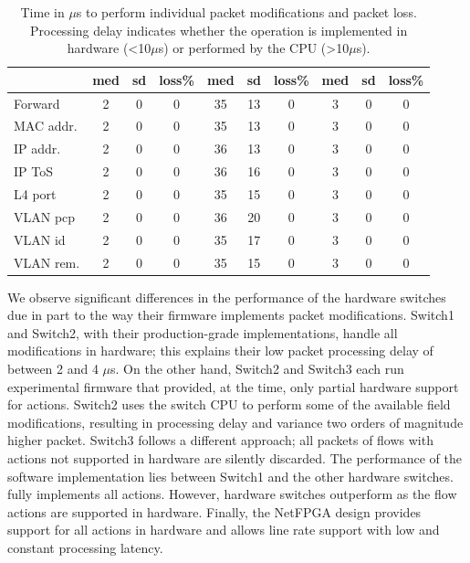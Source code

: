 \begin{table}[tb]
\begin{tabular}[t]{|l | c | c | c || c | c | c || c | c | c |}
              & med & sd & loss\% & med & sd & loss\% & med & sd & loss\% \\ \hline  
    Forward   & 2   & 0  & 0      & 35  & 13 & 0      & 3   & 0  & 0      \\\hline  
    MAC addr. & 2   & 0  & 0      & 35  & 13 & 0      & 3   & 0  & 0      \\ \hline  
    IP addr.  & 2   & 0  & 0      & 36  & 13 & 0      & 3   & 0  & 0      \\ \hline  
    IP ToS    & 2   & 0  & 0      & 36  & 16 & 0      & 3   & 0  & 0      \\ \hline  
    L4 port   & 2   & 0  & 0      & 35  & 15 & 0      & 3   & 0  & 0      \\ \hline  
    VLAN pcp  & 2   & 0  & 0      & 36  & 20 & 0      & 3   & 0  & 0      \\ \hline  
    VLAN id   & 2   & 0  & 0      & 35  & 17 & 0      & 3   & 0  & 0      \\ \hline  
    VLAN rem. & 2   & 0  & 0      & 35  & 15 & 0      & 3   & 0  & 0      \\ \hline
  \end{tabular}
 
  \caption[Switch action latency.]{Time in $\mu$s to perform individual packet
    modifications and packet loss. Processing delay indicates whether the
    operation is implemented in hardware (\textless10$\mu$s) or performed by
    the CPU (\textgreater10$\mu$s).}
  \label{tbl:feature_delay}
\end{table}

We observe significant differences in the performance of the hardware switches
due in part to the way their firmware implements packet modifications. Switch1
and Switch2, with their production-grade implementations, handle all
modifications in hardware; this explains their low packet processing delay of
between 2 and 4 $\mu$s. On the other hand, Switch2 and Switch3 each run
experimental firmware that provided, at the time, only partial hardware support
for \of actions. Switch2 uses the switch CPU to perform some of the available
field modifications, resulting in processing delay and variance two orders of
magnitude higher packet.  Switch3 follows a different approach; all packets of
flows with actions not supported in hardware are silently discarded. The
performance of the \ovs software implementation lies between Switch1 and the
other hardware switches.  \ovs fully implements all \of actions. However,
hardware switches outperform \ovs as the flow actions are supported in
hardware. Finally, the NetFPGA design provides support for all actions in
hardware and allows line rate support with low and constant processing latency. 

